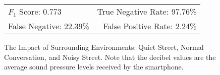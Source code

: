 \begin{landscape}
\begin{figure}[!h]
\begin{minipage}[c]{.33\linewidth}
\begin{tabular}{lr}
				$F_1$ Score: 0.773 & \hspace{-.00in} True Negative Rate: 97.76\% \\
				False Negative: 22.39\% & \hspace{-.00in} False Positive Rate: 2.24\% \\
				\bottomrule
			\end{tabular}
		\end{minipage}
		\caption[Impact of Surrounding Environments.]{The Impact of Surrounding Environments: Quiet Street, Normal Conversation, and Noisy Street. Note that the decibel values are the average sound pressure levels received by the smartphone. }
		\label{fig:noisetestresult}
	\end{figure}
\end{landscape}







